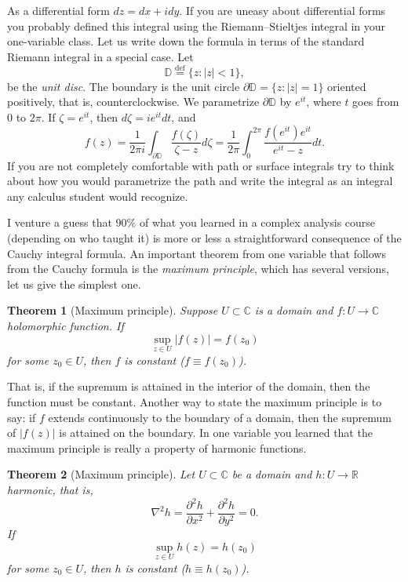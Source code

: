 \documentclass[12pt,openany]{book}
\newcommand{\sabs}[1]{\lvert {#1} \rvert}
\newcommand{\C}{{\mathbb{C}}}
\newcommand{\R}{{\mathbb{R}}}
\newcommand{\D}{{\mathbb{D}}}
\newcommand{\myindex}[1]{#1\index{#1}}
\theoremstyle{plain}
\newtheorem{thm}{Theorem}[section]
\theoremstyle{remark}
\theoremstyle{definition}
\theoremstyle{exercise}
\theoremstyle{example}
\begin{document}
As a differential form $dz = dx + i dy$.  If you are uneasy
about differential forms you probably defined this integral using
the Riemann--Stieltjes integral in your one-variable class.
Let us write down the formula in terms of the standard Riemann integral
in a special case.  Let
\begin{equation*}
\D
\overset{\text{def}}{=}
\{ z : \sabs{z} < 1 \} ,
\end{equation*}
be the \emph{\myindex{unit disc}}.  The boundary is the unit circle
$\partial \D = \{ z : \sabs{z} = 1 \}$ oriented positively, that is, counterclockwise.   We parametrize $\partial \D$
by $e^{it}$, where $t$ goes from 0 to $2\pi$.  If $\zeta = e^{it}$,
then $d\zeta = ie^{it}dt$, and
\begin{equation*}
f(z) =
\frac{1}{2\pi i}
\int_{\partial \D}
\frac{f(\zeta)}{\zeta-z}
d \zeta 
=
\frac{1}{2\pi}
\int_0^{2\pi}
\frac{f(e^{it}) e^{it} }{e^{it}-z}
dt .
\end{equation*}
If you are not completely comfortable
with
path or surface integrals try to think about how you would parametrize the path and
write the integral as an integral any calculus student would recognize.

I venture a guess that 90\% of what you learned in a complex analysis
course (depending on who taught it)
is more or less a straightforward consequence of the Cauchy
integral formula.
An important theorem from one variable that follows from
the Cauchy formula is the \emph{\myindex{maximum principle}},
which has several versions, let us give the simplest one.

\begin{thm}[Maximum principle]
Suppose $U \subset \C$ is a domain and $f \colon U \to \C$
holomorphic function.
If
\begin{equation*}
\sup_{z \in U} \sabs{f(z)} = f(z_0)
\end{equation*}
for some $z_0 \in U$, then $f$ is constant ($f \equiv f(z_0)$).
\end{thm}

That is, if the supremum is attained in the interior of the domain,
then the function must be constant.  Another way to state the maximum
principle is to say: if $f$ extends continuously to the boundary of a
domain, then the supremum of $\sabs{f(z)}$ is attained on the boundary.
In
one variable you learned that the maximum principle is really a
property of harmonic functions.

\begin{thm}[Maximum principle]
Let $U \subset \C$ be a domain and $h \colon U \to \R$
harmonic, that is,
\begin{equation*}
\nabla^2 h = \frac{\partial^2 h}{\partial x^2} + \frac{\partial^2 h}{\partial
y^2} = 0 .
\end{equation*}
If
\begin{equation*}
\sup_{z \in U} h(z) = h(z_0)
\end{equation*}
for some $z_0 \in U$, then $h$ is constant ($h \equiv h(z_0)$).
\end{thm}
\end{document}
